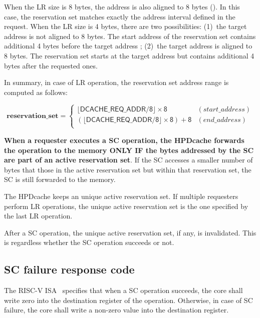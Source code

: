 \documentclass[10pt,titlepage,twoside]{book}
\begin{document}
When the \ac{LR} size is 8 bytes, the address is also aligned to 8 bytes ().
In this case, the reservation set matches exactly the address interval defined in the request.
When the \ac{LR} size is 4 bytes, there are two possibilities: (1)~the target address is not aligned to 8 bytes.
The start address of the reservation set contains additional 4 bytes before the target address ;
(2)~the target address is aligned to 8 bytes.
The reservation set starts at the target address but contains additional 4 bytes after the requested ones.

In summary, in case of \ac{LR} operation, the reservation set address range is computed as follows:

\begin{equation*}
    \mathbf{reservation\_set =}
    \begin{cases}
    \mathsf{\lfloor{}DCACHE\_REQ\_ADDR / 8\rfloor{} \times 8} &
      (start\_address) \\
    \mathsf{(\lfloor{}DCACHE\_REQ\_ADDR / 8\rfloor{} \times 8) + 8} &
      (end\_address) \\
    \end{cases}
\end{equation*}

{\bf When a requester executes a \ac{SC} operation, the \ac{HPDcache} forwards the operation to the memory ONLY IF the bytes addressed by the \ac{SC} are part of an active reservation set}.
If the \ac{SC} accesses a smaller number of bytes that those in the active reservation set but within that reservation set, the \ac{SC} is still forwarded to the memory.

The \ac{HPDcache} keeps an unique active reservation set.
If multiple requesters perform \ac{LR} operations, the unique active reservation set is the one specified by the last \ac{LR} operation.


After a \ac{SC} operation, the unique active reservation set, if any, is invalidated.
This is regardless whether the \ac{SC} operation succeeds or not.


\subsection{\ac*{SC} failure response code}

The RISC-V ISA~\cite{RISCV_spec} specifies that when a \ac{SC} operation succeeds, the core shall write zero into the destination register of the operation.
Otherwise, in case of \ac{SC} failure, the core shall write a non-zero value into the destination register.
\end{document}
